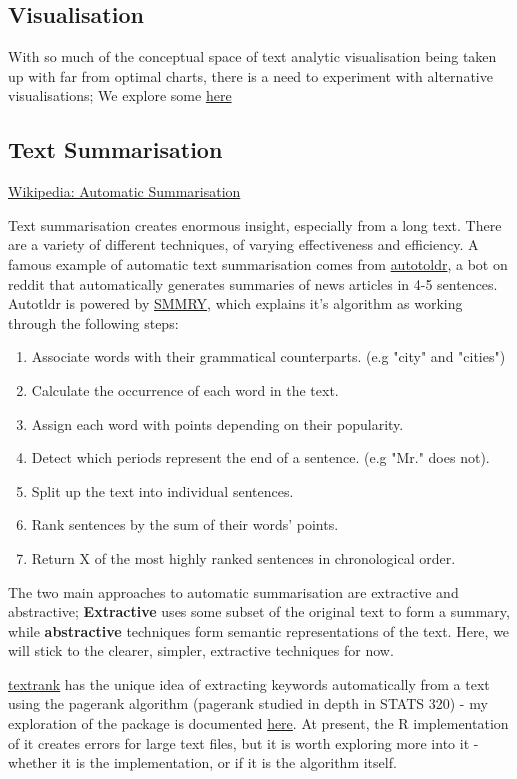\documentclass[a4paper, 11pt]{article}
\begin{document}
\subsection{Visualisation}
\label{sec:org54d6ff5}
With so much of the conceptual space of text analytic visualisation
being taken up with far from optimal charts, there is a need to
experiment with alternative visualisations; We explore some \href{sent-vis.org}{here}
\subsection{Text Summarisation}
\label{sec:org83ef2c5}
\href{https://en.wikipedia.org/wiki/Automatic\_summarization}{Wikipedia: Automatic Summarisation}

Text summarisation creates enormous insight, especially from a long
text. There are a variety of different techniques, of varying
effectiveness and efficiency. A famous example of automatic text
summarisation comes from \href{https://www.reddit.com/user/autotldr}{autotoldr}, a bot on reddit that automatically
generates summaries of news articles in 4-5 sentences. Autotldr is
powered by \href{https://smmry.com/about}{SMMRY}, which explains it's algorithm as working through the
following steps:

\begin{enumerate}
\item Associate words with their grammatical counterparts. (e.g "city"
and "cities")
\item Calculate the occurrence of each word in the text.
\item Assign each word with points depending on their popularity.
\item Detect which periods represent the end of a sentence. (e.g "Mr."
does not).
\item Split up the text into individual sentences.
\item Rank sentences by the sum of their words' points.
\item Return X of the most highly ranked sentences in chronological
order.
\end{enumerate}

The two main approaches to automatic summarisation are extractive and
abstractive; \textbf{Extractive} uses some subset of the original text to
form a summary, while \textbf{abstractive} techniques form semantic
representations of the text. Here, we will stick to the clearer,
simpler, extractive techniques for now.

\href{https://github.com/bnosac/textrank}{textrank} has the unique idea of extracting keywords automatically from
a text using the pagerank algorithm (pagerank studied in depth in
STATS 320) - my exploration of the package is documented \href{./textrank\_exploration.Rmd}{here}. At
present, the R implementation of it creates errors for large text
files, but it is worth exploring more into it - whether it is the
implementation, or if it is the algorithm itself.
\end{document}
